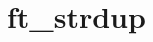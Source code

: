 \chapter{ft\+\_\+strdup}
\hypertarget{md_Documentation_2ft__strdup}{}\label{md_Documentation_2ft__strdup}
